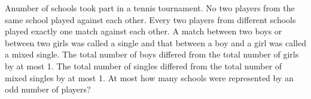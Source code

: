 Anumber of schools took part in a tennis tournament. No two players from the same school played against each other. Every two players from different schools played exactly one match against each other. A match between two boys or between two girls was called a single and that between a boy and a girl was called a mixed single. The total number of boys differed from the total number of girls by at most 1. The total number of singles differed from the total number of mixed singles by at most 1. At most how many schools were represented by an odd number of players?